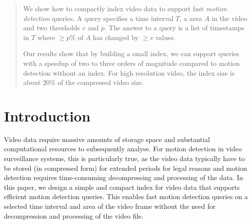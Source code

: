 \begin{abstract}
    We show how to compactly index video data to support fast \emph{motion detection} queries. 
    A query specifies a time interval $T$, a area $A$ in the video and two thresholds $v$ and $p$. The answer to a query is a list of timestamps in $T$ where $\geq p\%$ of $A$ has changed by $\geq v$ values.
    
    Our results show that by building a small index, we can support queries with a speedup of two to three orders of magnitude compared to motion detection without an index. For high resolution video, the index size is about $20\%$ of the compressed video size.
\end{abstract}



%



\section{Introduction}
Video data require massive amounts of storage space and substantial computational resources to subsequently analyse. For motion detection in video surveillance systems, this is particularly true, as the video data typically have to be stored (in compressed form) for extended periods for legal reasons and motion detection requires time-consuming decompressing and processing of the data. In this paper, we design a simple and compact index for video data that supports efficient motion detection queries. This enables fast motion detection queries on a selected time interval and area of the video frame without the need for decompression and processing of the video file. 

